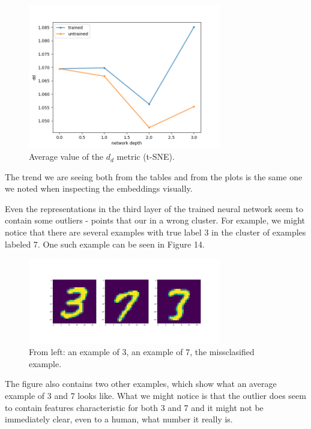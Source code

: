 \documentclass{article}
\begin{document}
\begin{figure}
  \centering
    \includegraphics[width=0.75\textwidth]{../../out/activations_cnn/mnist/t-sne/plot_metric_dd.png}
    \caption{Average value of the \(d_d\) metric (t-SNE).}
\end{figure}

The trend we are seeing both from the tables and from the plots is the same
one we noted when inspecting the embeddings visually.

Even the representations in the third layer of the trained neural network
seem to contain some outliers - points that our in a wrong cluster. For
example, we might notice that there are several examples with true label
3 in the cluster of examples labeled 7. One such example can be seen in
Figure 14.

\begin{figure}
  \centering
  \includegraphics[width=0.75\textwidth]{../../out/activations_cnn/mnist/t-sne/outliers/correct3_predicted7.png}
    \caption{From left: an example of 3, an example of 7, the missclasified example.}
\end{figure}

The figure also contains two other examples, which show what an average
example of 3 and 7 looks like. What we might notice is that the outlier
does seem to contain features characteristic for both 3 and 7 and it
might not be immediately clear, even to a human, what number it really
is.
\end{document}
